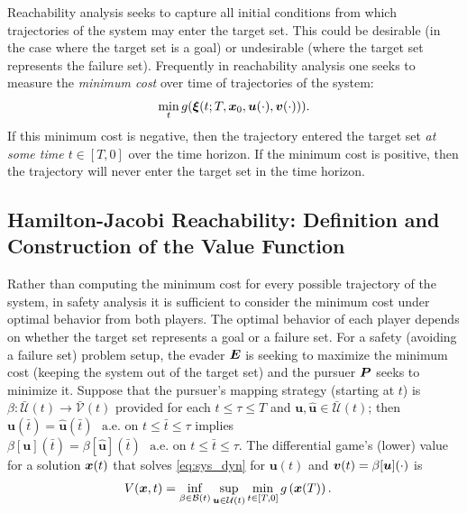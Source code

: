 Reachability analysis seeks to capture all initial conditions from which trajectories of the system may enter the target set.  This could be desirable (in the case where the target set is a goal) or undesirable (where the target set represents the failure set). Frequently in reachability analysis one seeks to measure the \textit{minimum cost} over time of trajectories of the system:
\begin{align}
	\min_t g(\bm{\xi}(t; T, \bm{x}_0, \bm{u}(\cdot), \bm{v}(\cdot))).
\end{align}
If this minimum cost is negative, then the trajectory entered the target set \textit{at some time $t\in[T,0]$} over the time horizon. If the minimum cost is positive, then the trajectory will never enter the target set in the time horizon. 

\subsection{Hamilton-Jacobi Reachability: Definition and Construction of the Value Function}
Rather than computing the minimum cost for every possible trajectory of the system, in safety analysis it is sufficient to consider the minimum cost under optimal behavior from both players.  The optimal behavior of each player depends on whether the target set represents a goal or a failure set. For a safety (avoiding a failure set) problem setup, the evader $\bm{E}$ is seeking to maximize the minimum cost (keeping the system out of the target set) and the pursuer $\bm{P}$ seeks to minimize it. 
Suppose that the pursuer's mapping strategy (starting at $t$) is $\beta: \mathcal{\bar{U}}({t}) \rightarrow \mathcal{\bar{V}}({t})$ provided for each $t \le \tau \le T$ and $\bm{u}, \hat{\bm{u}} \in \mathcal{\bar{U}}({t})$; then $\bm{u}(\bar{t}) = \hat{\bm{u}}(\bar{t}) \,\, \text{ a.e. on } t \le \bar{t}  \le \tau$ implies $\beta[\bm{u}](\bar{t}) = \beta[\hat{\bm{u}}](\bar{t}) \,\, \text{ a.e. on } t \le \bar{t}  \le \tau$.
%
The differential game's (lower) value for a solution $\bm{x}(t)$ that solves \eqref{eq:sys_dyn} for $\bm{u}(t)$ and $\bm{v}(t) = \beta[\bm{u}](\cdot)$ is 
%
\begin{align}
	&V(\state, t) = %
	\inf_{\beta \in \mathcal{B}(t)} \sup_{\bm{u} \in \mathcal{U}(t)} %
	\min_{t\in[T,0]}
	g\left(\bm{x}(T)\right). %
	\label{eq:value_lower}
\end{align}

